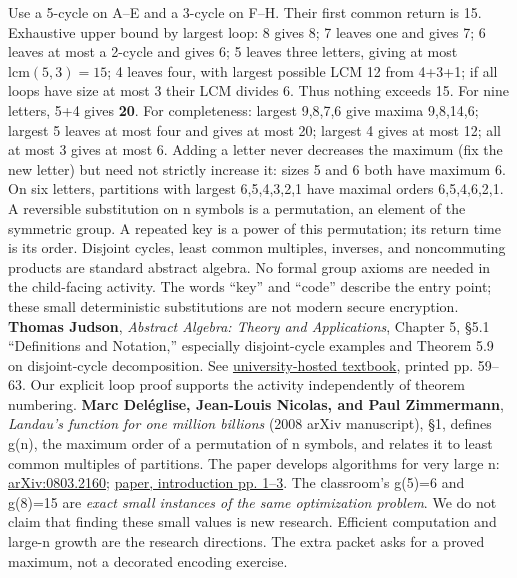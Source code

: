 \documentclass[12pt]{extarticle}
\begin{document}
Use a 5-cycle on A--E and a 3-cycle on F--H. Their first common return is 15. Exhaustive upper bound by largest loop: 8 gives 8; 7 leaves one and gives 7; 6 leaves at most a 2-cycle and gives 6; 5 leaves three letters, giving at most \(\mathrm{lcm}(5,3)=15\); 4 leaves four, with largest possible LCM 12 from 4+3+1; if all loops have size at most 3 their LCM divides 6. Thus nothing exceeds 15.
For nine letters, 5+4 gives \textbf{20}. For completeness: largest 9,8,7,6 give maxima 9,8,14,6; largest 5 leaves at most four and gives at most 20; largest 4 gives at most 12; all at most 3 gives at most 6. Adding a letter never decreases the maximum (fix the new letter) but need not strictly increase it: sizes 5 and 6 both have maximum 6. On six letters, partitions with largest 6,5,4,3,2,1 have maximal orders 6,5,4,6,2,1.
\newpage
{}
A reversible substitution on n symbols is a permutation, an element of the symmetric group. A repeated key is a power of this permutation; its return time is its order. Disjoint cycles, least common multiples, inverses, and noncommuting products are standard abstract algebra. No formal group axioms are needed in the child-facing activity. The words ``key'' and ``code'' describe the entry point; these small deterministic substitutions are not modern secure encryption.
\textbf{Thomas Judson}, \emph{Abstract Algebra: Theory and Applications}, Chapter 5, \S5.1 ``Definitions and Notation,'' especially disjoint-cycle examples and Theorem 5.9 on disjoint-cycle decomposition. See \href{https://people.hsc.edu/faculty-staff/blins/books/JudsonAbstractAlgebra.pdf}{university-hosted textbook}, printed pp. 59--63. Our explicit loop proof supports the activity independently of theorem numbering.
\textbf{Marc Del\'eglise, Jean-Louis Nicolas, and Paul Zimmermann}, \emph{Landau's function for one million billions} (2008 arXiv manuscript), \S1, defines g(n), the maximum order of a permutation of n symbols, and relates it to least common multiples of partitions. The paper develops algorithms for very large n: \href{https://arxiv.org/abs/0803.2160}{arXiv:0803.2160}; \href{https://arxiv.org/pdf/0803.2160}{paper, introduction pp. 1--3}.
The classroom's g(5)=6 and g(8)=15 are \emph{exact small instances of the same optimization problem}. We do not claim that finding these small values is new research. Efficient computation and large-n growth are the research directions. The extra packet asks for a proved maximum, not a decorated encoding exercise.
\end{document}
